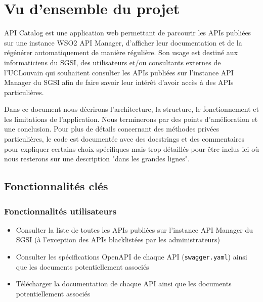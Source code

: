 \section{Vu d'ensemble du projet}
API Catalog est une application web permettant de parcourir les APIs publiées sur une instance WSO2 API Manager, d'afficher leur documentation et de la régénérer automatiquement de manière régulière. Son usage est destiné aux informaticiens du SGSI, des utilisateurs et/ou consultants externes de l'UCLouvain qui souhaitent consulter les APIs publiées sur l'instance API Manager du SGSI afin de faire savoir leur intérêt d'avoir accès à des APIs particulières.\bigskip

Dans ce document nous décrirons l'architecture, la structure, le fonctionnement et les limitations de l'application. Nous terminerons par des points d'amélioration et une conclusion. Pour plus de détails concernant des méthodes privées particulières, le code est documentée avec des docstrings et des commentaires pour expliquer certains choix spécifiques mais trop détaillés pour être inclus ici où nous resterons sur une description "dans les grandes lignes".

\subsection{Fonctionnalités clés}
\subsubsection{Fonctionnalités utilisateurs}
\begin{itemize}
    \item[$\bullet$] Consulter la liste de toutes les APIs publiées sur l'instance API Manager du SGSI (à l'exception des APIs blacklistées par les administrateurs)
    \item[$\bullet$] Consulter les spécifications OpenAPI de chaque API (\texttt{swagger.yaml}) ainsi que les documents potentiellement associés
    \item[$\bullet$] Télécharger la documentation de chaque API ainsi que les documents potentiellement associés
\end{itemize}

